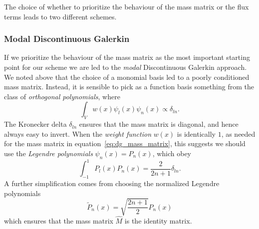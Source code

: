 The choice of whether to prioritize the behaviour of the mass matrix or the
flux terms leads to two different schemes.

\subsubsection{Modal Discontinuous Galerkin}
\label{sec:dg_modal}

If we prioritize the behaviour of the mass matrix as the most important starting
point for our scheme we are led to the \emph{modal} Discontinuous Galerkin
approach. We noted above that the choice of a monomial basis led to a poorly
conditioned mass matrix.
Instead, it is sensible to pick as a function basis something from the class
of \emph{orthogonal polynomials}, where
%
\begin{equation}
  \label{eq:dg_orthog_polys}
  \int_V w(x) \psi_l(x) \psi_n(x) \propto \delta_{ln}.
\end{equation}
%
The Kronecker delta $\delta_{ln}$ ensures that the mass matrix is diagonal, and
hence always easy to invert.
When the \emph{weight function} $w(x)$ is identically $1$, as needed for the
mass matrix in equation~\ref{eq:dg_mass_matrix}, this suggests we should use the
\emph{Legendre polynomials} $\psi_n(x) = P_n(x)$, which obey
%
\begin{equation}
  \label{eq:dg_legendre_poly}
  \int_{-1}^1 P_l(x) P_n(x) = \frac{2}{2 n + 1} \delta_{ln}.
\end{equation}
%
A further simplification comes from choosing the normalized Legendre polynomials
%
\begin{equation}
  \label{eq:dg_legendre_poly_norm}
  \tilde{P}_n(x) = \sqrt{\frac{2 n + 1}{2}} P_n(x)
\end{equation}
%
which ensures that the mass matrix $\hat{M}$ is the identity matrix.

